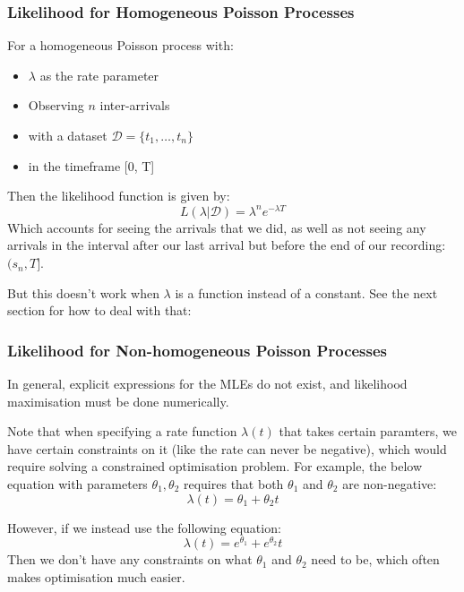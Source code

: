 \subsubsection{Likelihood for Homogeneous Poisson Processes}
For a homogeneous Poisson process with:
\begin{itemize}
    \item $\lambda$ as the rate parameter
    \item  Observing $n$ inter-arrivals
    \item with a dataset $\mathcal{D} = \{t_{1}, \dots, t_{n} \}$ 
    \item in the timeframe [0, T]
\end{itemize}
Then the likelihood function is given by:
\begin{equation*}
    L(\lambda|\mathcal{D}) = \lambda^{n}e^{-\lambda T}
\end{equation*}
Which accounts for seeing the arrivals that we did, as well as not seeing any
arrivals in the interval after our last arrival but before the end of our
recording: $(s_{n}, T]$.

But this doesn't work when $\lambda$ is a function instead of a constant. See
the next section for how to deal with that:

\subsubsection{Likelihood for Non-homogeneous Poisson Processes}
In general, explicit expressions for the MLEs do not exist, and likelihood
maximisation must be done numerically.  

Note that when specifying a rate function $\lambda(t)$ that takes certain
paramters, we have certain constraints on it (like the rate can never be
negative), which would require solving a constrained optimisation problem. For
example, the below equation with parameters $\theta_{1}, \theta_{2}$ requires
that both $\theta_{1}$ and $\theta_{2}$ are non-negative:
\begin{equation*}
    \lambda(t) = \theta_{1} + \theta_{2}t
\end{equation*}

However, if we instead use the following equation:
\begin{equation*}
    \lambda(t) = e^{\theta_{1}} + e^{\theta_{2}}t
\end{equation*}
Then we don't have any constraints on what $\theta_{1}$ and $\theta_{2}$ need to
be, which often makes optimisation much easier.

